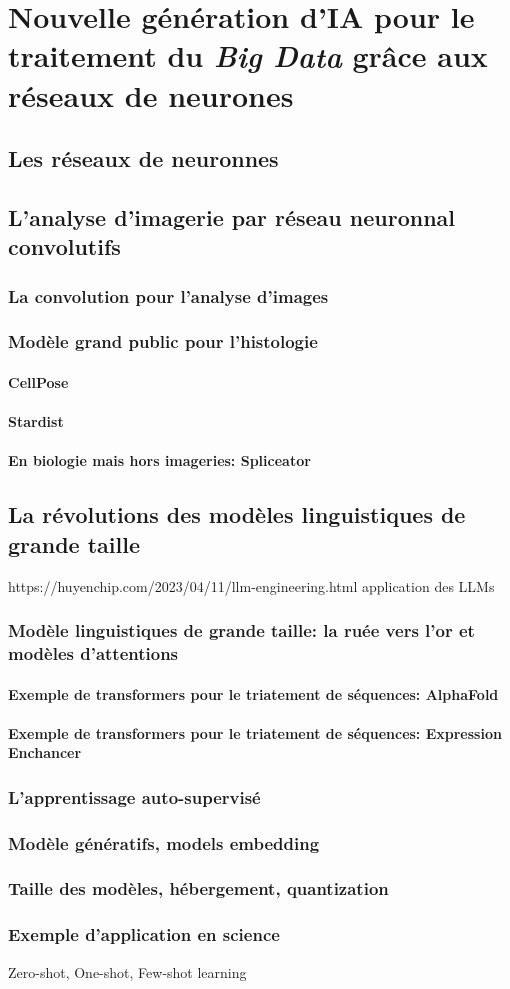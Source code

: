 \chapter{Nouvelle génération d’IA pour le traitement du \textit{Big Data} grâce aux réseaux de neurones}
\section{Les réseaux de neuronnes}
\section{L'analyse d'imagerie par  réseau neuronnal convolutifs}
\subsection{La convolution pour l'analyse d'images}
\subsection{Modèle grand public pour l'histologie}
\subsubsection{CellPose}
\subsubsection{Stardist}
\subsubsection{En biologie mais hors imageries: Spliceator}
\section{La révolutions des modèles linguistiques de grande taille}
https://huyenchip.com/2023/04/11/llm-engineering.html application des LLMs
\subsection{Modèle linguistiques de grande taille: la ruée vers l'or et modèles d'attentions}
\subsubsection{Exemple de transformers pour le triatement de séquences: AlphaFold}
\subsubsection{Exemple de transformers pour le triatement de séquences: Expression Enchancer}
\subsection{L'apprentissage auto-supervisé}
\subsection{Modèle génératifs, models embedding}
\subsection{Taille des modèles, hébergement, quantization}
\subsection{Exemple d'application en science}

Zero-shot, One-shot, Few-shot learning